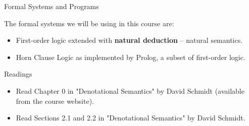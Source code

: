 \documentclass{beamer}
\begin{document}
\begin{frame}{Formal Systems and Programs}

The formal systems we will be using in this course are:
\begin{itemize}
\item First-order logic extended with {\bf natural deduction} -- natural semantics.
\item Horn Clause Logic as implemented by Prolog, a subset of first-order logic.
\end{itemize}
\end{frame}

\begin{frame}{Readings}
\begin{itemize}
\item Read Chapter 0 in "Denotational Semantics" by David Schmidt (available from the course website).
\item Read Sections 2.1 and 2.2 in "Denotational Semantics" by David Schmidt.
\end{itemize}
\end{frame}
\end{document}
